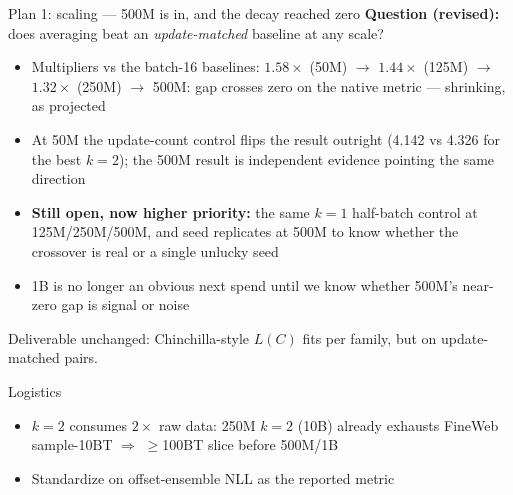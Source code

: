 \documentclass[10pt,aspectratio=169]{beamer}
\newcommand{\bad}[1]{\textcolor{warnred}{#1}}
\begin{document}
\begin{frame}{Plan 1: scaling --- 500M is in, and the decay reached zero}
  \small
  \textbf{Question (revised):} does averaging beat an \emph{update-matched}
  baseline at any scale?
  \begin{itemize}
    \item Multipliers vs the batch-16 baselines: $1.58\times$ (50M) $\to$
          $1.44\times$ (125M) $\to$ $1.32\times$ (250M) $\to$
          \bad{500M: gap crosses zero on the native metric} --- shrinking,
          as projected
    \item At 50M the update-count control flips the result outright
          (4.142 vs 4.326 for the best $k{=}2$); the 500M result is
          independent evidence pointing the same direction
    \item \textbf{Still open, now higher priority:} the same $k{=}1$
          half-batch control at 125M/250M/500M, and seed replicates at 500M
          to know whether the crossover is real or a single unlucky seed
    \item 1B is no longer an obvious next spend until we know whether 500M's
          near-zero gap is signal or noise
  \end{itemize}

  \vspace{0.4em}
  Deliverable unchanged: Chinchilla-style $L(C)$ fits per family, but on
  update-matched pairs.

  \vspace{0.4em}
  \begin{alertblock}{Logistics}
    \begin{itemize}
      \item $k{=}2$ consumes $2\times$ raw data: 250M $k{=}2$ (10B) already
            exhausts FineWeb sample-10BT $\Rightarrow$ $\geq$100BT slice
            before 500M/1B
      \item Standardize on offset-ensemble NLL as the reported metric
    \end{itemize}
  \end{alertblock}
\end{frame}
\end{document}
